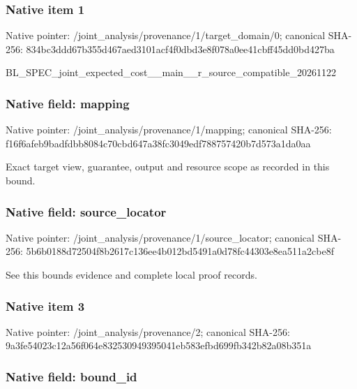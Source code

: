 \documentclass[10pt,a4paper]{article}
\begin{document}
\subsubsection{Native item 1}


Native pointer: /joint\_analysis/provenan\allowbreak{}ce/1/target\_domain/0; canonical SHA-256: 834bc3ddd67b355d467aed31\allowbreak{}01acf4f0dbd3e8f078a0ee41\allowbreak{}cbff45dd0bd427ba


BL\_SPEC\_joint\_expected\_c\allowbreak{}ost\_\_main\_\_r\_source\_comp\allowbreak{}atible\_20261122


\subsubsection{Native field: mapping}


Native pointer: /joint\_analysis/provenance/1/mapping; canonical SHA-256: f16f6afeb9badfdbb8084c70\allowbreak{}cbd647a38fc3049edf788757\allowbreak{}420b7d573a1da0aa


Exact target view, guarantee, output and resource scope as recorded in this bound.


\subsubsection{Native field: source\_locator}


Native pointer: /joint\_analysis/provenan\allowbreak{}ce/1/source\_locator; canonical SHA-256: 5b6b0188d72504f8b2617c13\allowbreak{}6ee4b012bd5491a0d78fc443\allowbreak{}03e8ea511a2cbe8f


See this bounds evidence and complete local proof records.


\subsubsection{Native item 3}


Native pointer: /joint\_analysis/provenance/2; canonical SHA-256: 9a3fe54023c12a56f064e832\allowbreak{}530949395041eb583efbd699\allowbreak{}fb342b82a08b351a



\subsubsection{Native field: bound\_id}
\end{document}
